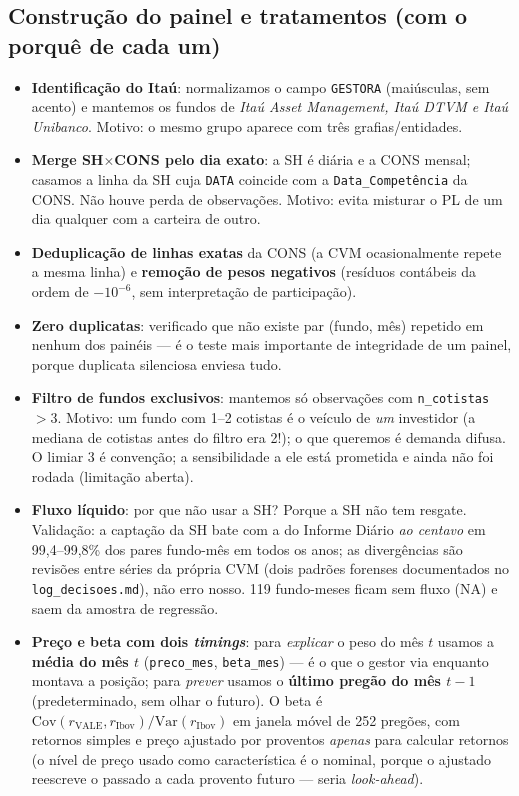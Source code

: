 \documentclass[11pt,a4paper]{article}
\begin{document}
\subsection{Construção do painel e tratamentos (com o porquê de cada um)}

\begin{itemize}[topsep=2pt,itemsep=2pt]
\item \textbf{Identificação do Itaú}: normalizamos o campo \texttt{GESTORA} (maiúsculas, sem
acento) e mantemos os fundos de \emph{Itaú Asset Management, Itaú DTVM e Itaú Unibanco}. Motivo: o
mesmo grupo aparece com três grafias/entidades.
\item \textbf{Merge SH$\times$CONS pelo dia exato}: a SH é diária e a CONS mensal; casamos a linha
da SH cuja \texttt{DATA} coincide com a \texttt{Data\_Competência} da CONS. Não houve perda de
observações. Motivo: evita misturar o PL de um dia qualquer com a carteira de outro.
\item \textbf{Deduplicação de linhas exatas} da CONS (a CVM ocasionalmente repete a mesma linha) e
\textbf{remoção de pesos negativos} (resíduos contábeis da ordem de $-10^{-6}$, sem interpretação
de participação).
\item \textbf{Zero duplicatas}: verificado que não existe par (fundo, mês) repetido em nenhum dos
painéis --- é o teste mais importante de integridade de um painel, porque duplicata silenciosa
enviesa tudo.
\item \textbf{Filtro de fundos exclusivos}: mantemos só observações com \texttt{n\_cotistas}~$>3$.
Motivo: um fundo com 1--2 cotistas é o veículo de \emph{um} investidor (a mediana de cotistas
antes do filtro era 2!); o que queremos é demanda difusa. O limiar 3 é convenção; a sensibilidade
a ele está prometida e ainda não foi rodada (limitação aberta).
\item \textbf{Fluxo líquido}: por que não usar a SH? Porque a SH não tem resgate. Validação: a
captação da SH bate com a do Informe Diário \emph{ao centavo} em 99{,}4--99{,}8\% dos pares
fundo-mês em todos os anos; as divergências são revisões entre séries da própria CVM (dois padrões
forenses documentados no \texttt{log\_decisoes.md}), não erro nosso. 119 fundo-meses ficam sem
fluxo (NA) e saem da amostra de regressão.
\item \textbf{Preço e beta com dois \emph{timings}}: para \emph{explicar} o peso do mês $t$ usamos
a \textbf{média do mês $t$} (\texttt{preco\_mes}, \texttt{beta\_mes}) --- é o que o gestor via
enquanto montava a posição; para \emph{prever} usamos o \textbf{último pregão do mês $t-1$}
(predeterminado, sem olhar o futuro). O beta é $\mathrm{Cov}(r_{\text{VALE}},
r_{\text{Ibov}})/\mathrm{Var}(r_{\text{Ibov}})$ em janela móvel de 252 pregões, com retornos
simples e preço ajustado por proventos \emph{apenas} para calcular retornos (o nível de preço
usado como característica é o nominal, porque o ajustado reescreve o passado a cada provento
futuro --- seria \emph{look-ahead}).
\end{itemize}
\end{document}
